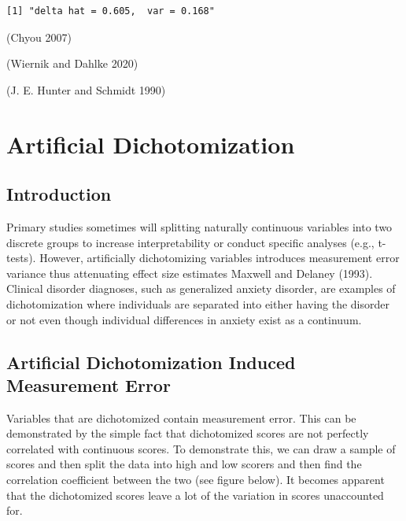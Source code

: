 \documentclass[
  letterpaper,
  DIV=11,
  numbers=noendperiod]{scrreprt}
\begin{document}
\begin{verbatim}
[1] "delta hat = 0.605,  var = 0.168"
\end{verbatim}

(Chyou 2007)

(Wiernik and Dahlke 2020)

(J. E. Hunter and Schmidt 1990)

\hypertarget{artificial-dichotomization}{%
\chapter{Artificial Dichotomization}\label{artificial-dichotomization}}

\hypertarget{introduction-2}{%
\section{Introduction}\label{introduction-2}}

Primary studies sometimes will splitting naturally continuous variables
into two discrete groups to increase interpretability or conduct
specific analyses (e.g., t-tests). However, artificially dichotomizing
variables introduces measurement error variance thus attenuating effect
size estimates Maxwell and Delaney (1993). Clinical disorder diagnoses,
such as generalized anxiety disorder, are examples of dichotomization
where individuals are separated into either having the disorder or not
even though individual differences in anxiety exist as a continuum.

\hypertarget{artificial-dichotomization-induced-measurement-error}{%
\section{Artificial Dichotomization Induced Measurement
Error}\label{artificial-dichotomization-induced-measurement-error}}

Variables that are dichotomized contain measurement error. This can be
demonstrated by the simple fact that dichotomized scores are not
perfectly correlated with continuous scores. To demonstrate this, we can
draw a sample of scores and then split the data into high and low
scorers and then find the correlation coefficient between the two (see
figure below). It becomes apparent that the dichotomized scores leave a
lot of the variation in scores unaccounted for.
\end{document}
